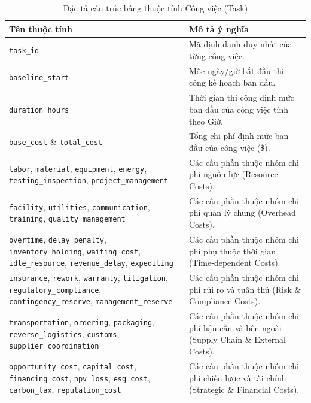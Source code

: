 \begin{table}[H]
\centering
\caption{Đặc tả cấu trúc bảng thuộc tính Công việc (Task)}
\label{tab:task_input_schema}
\begin{tabular}{|p{4.5cm}|p{10.5cm}|}
\hline
\textbf{Tên thuộc tính} & \textbf{Mô tả ý nghĩa} \\ \hline
\texttt{task\_id} & Mã định danh duy nhất của từng công việc. \\ \hline
\texttt{baseline\_start} & Mốc ngày/giờ bắt đầu thi công kế hoạch ban đầu. \\ \hline
\texttt{duration\_hours} & Thời gian thi công định mức ban đầu của công việc tính theo Giờ. \\ \hline
\texttt{base\_cost} \& \texttt{total\_cost} & Tổng chi phí định mức ban đầu của công việc (\$). \\ \hline
\texttt{labor}, \texttt{material}, \texttt{equipment}, \texttt{energy}, \texttt{testing\_inspection}, \texttt{project\_management} & Các cấu phần thuộc nhóm chi phí nguồn lực (Resource Costs). \\ \hline
\texttt{facility}, \texttt{utilities}, \texttt{communication}, \texttt{training}, \texttt{quality\_management} & Các cấu phần thuộc nhóm chi phí quản lý chung (Overhead Costs). \\ \hline
\texttt{overtime}, \texttt{delay\_penalty}, \texttt{inventory\_holding}, \texttt{waiting\_cost}, \texttt{idle\_resource}, \texttt{revenue\_delay}, \texttt{expediting} & Các cấu phần thuộc nhóm chi phí phụ thuộc thời gian (Time-dependent Costs). \\ \hline
\texttt{insurance}, \texttt{rework}, \texttt{warranty}, \texttt{litigation}, \texttt{regulatory\_compliance}, \texttt{contingency\_reserve}, \texttt{management\_reserve} & Các cấu phần thuộc nhóm chi phí rủi ro và tuân thủ (Risk \& Compliance Costs). \\ \hline
\texttt{transportation}, \texttt{ordering}, \texttt{packaging}, \texttt{reverse\_logistics}, \texttt{customs}, \texttt{supplier\_coordination} & Các cấu phần thuộc nhóm chi phí hậu cần và bên ngoài (Supply Chain \& External Costs). \\ \hline
\texttt{opportunity\_cost}, \texttt{capital\_cost}, \texttt{financing\_cost}, \texttt{npv\_loss}, \texttt{esg\_cost}, \texttt{carbon\_tax}, \texttt{reputation\_cost} & Các cấu phần thuộc nhóm chi phí chiến lược và tài chính (Strategic \& Financial Costs). \\ \hline
\end{tabular}
\end{table}

